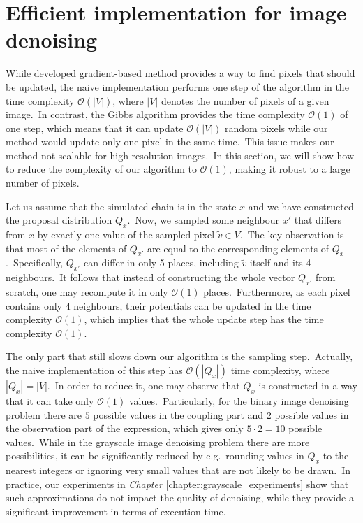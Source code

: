 \documentclass[shortabstract, english, lic]{iithesis}
\theoremstyle{default_theorem_style}\newtheorem{theorem}{Theorem}
\theoremstyle{default_theorem_style}\newtheorem{definition}{Definition}
\begin{document}
\section{Efficient implementation for image denoising}\label{sec:efficient_denoising}

While developed gradient-based method provides a way to find pixels that should be updated, the naive
implementation performs one step of the algorithm in the time complexity $\mathcal{O}(|V|)$,
where $|V|$ denotes the number of pixels of a given image.\ In contrast, the Gibbs
algorithm provides the time complexity $\mathcal{O}(1)$ of one step, which means that it can update
$\mathcal{O}(|V|)$ random pixels while our method would update only one pixel in the same time.\ This issue makes
our method not scalable for high-resolution images.\ In this section, we will show how to reduce the complexity
of our algorithm to $\mathcal{O}(1)$, making it robust to a large number of pixels.\newline

\noindent Let us assume that the simulated chain is in the state $x$ and we have constructed the proposal distribution
$Q_x$.\ Now, we sampled some neighbour $x'$ that differs from $x$ by exactly one value of the sampled pixel
$\tilde{v} \in V$.\ The key observation is that most of the elements of $Q_{x'}$ are equal to the corresponding
elements of $Q_x$.\ Specifically, $Q_{x'}$ can differ in only 5 places, including $\tilde{v} $ itself and its
4 neighbours.\ It follows that instead of constructing the whole vector $Q_{x'}$ from scratch, one may recompute
it in only $\mathcal{O}(1)$ places.\ Furthermore, as each pixel contains only 4 neighbours, their potentials
can be updated in the time complexity $\mathcal{O}(1)$, which implies that the whole update step has the time
complexity $\mathcal{O}(1)$.\newline

\noindent The only part that still slows down our algorithm is the sampling step.\ Actually, the naive implementation
of this step has $\mathcal{O}(|Q_x|)$ time complexity, where $|Q_x| = |V|$.\ In order to reduce it, one may
observe that $Q_x$ is constructed in a way that it can take only $\mathcal{O}(1)$ values.\ Particularly,
for the binary image denoising problem there are $5$ possible values in the coupling part and $2$ possible
values in the observation part of the expression, which gives only $5 \cdot 2 = 10$ possible values.\ While in the
grayscale image denoising problem there are more possibilities, it can be significantly reduced by e.g.\ rounding
values in $Q_x$ to the nearest integers or ignoring very small values that are not likely to be drawn.\ In
practice, our experiments in \textit{Chapter} \ref{chapter:grayscale_experiments} show that such
approximations do not impact the quality of denoising, while they provide a significant improvement in terms of
execution time.\newline
\end{document}
